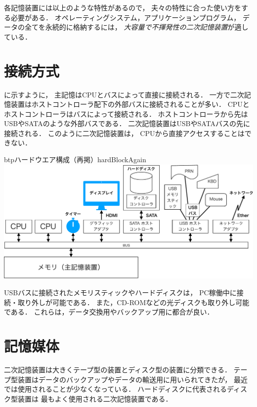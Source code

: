 各記憶装置には以上のような特性があるので，
夫々の特性に合った使い方をする必要がある．
オペレーティングシステム，アプリケーションプログラム，
データの全てを永続的に格納するには，
\emph{大容量で不揮発性の二次記憶装置}が適している．

\section{接続方式}
に示すように，
主記憶はCPUとバスによって直接に接続される．
一方で二次記憶装置はホストコントローラ配下の外部バスに接続されることが多い．
CPUとホストコントローラはバスによって接続される．
ホストコントローラから先はUSBやSATAのような外部バスである．
二次記憶装置はUSBやSATAバスの先に接続される．
このように二次記憶装置は，
CPUから直接アクセスすることはできない．

\begin{myfig}{btp}{ハードウエア構成（再掲）}{hardBlockAgain}
  \includegraphics[scale=0.55]{Fig/hardBlock-crop.pdf}
\end{myfig}

USBバスに接続されたメモリスティックやハードディスクは，
PC稼働中に接続・取り外しが可能である．
また，CD-ROMなどの光ディスクも取り外し可能である．
これらは，データ交換用やバックアップ用に都合が良い．

\section{記憶媒体}
二次記憶装置は大きくテープ型の装置とディスク型の装置に分類できる．
テープ型装置はデータのバックアップやデータの輸送用に用いられてきたが，
最近では使用されることが少なくなっている．
ハードディスクに代表されるディスク型装置は
最もよく使用される二次記憶装置である．

